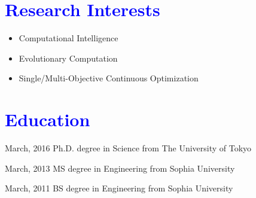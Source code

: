 \documentclass[letterpaper]{article}
\begin{document}




\section{\textcolor{blue}{Research Interests}}

\begin{itemize}
  \item Computational Intelligence
  \item Evolutionary Computation
  \item Single/Multi-Objective Continuous Optimization   
\end{itemize}


\clearpage


\section{\textcolor{blue}{Education}}

\begin{CV}
\item[March, 2016] Ph.D. degree in Science from The University of Tokyo
\item[March, 2013] MS degree in Engineering from Sophia University
\item[March, 2011] BS degree in Engineering from Sophia University
\end{CV}
\end{document}
